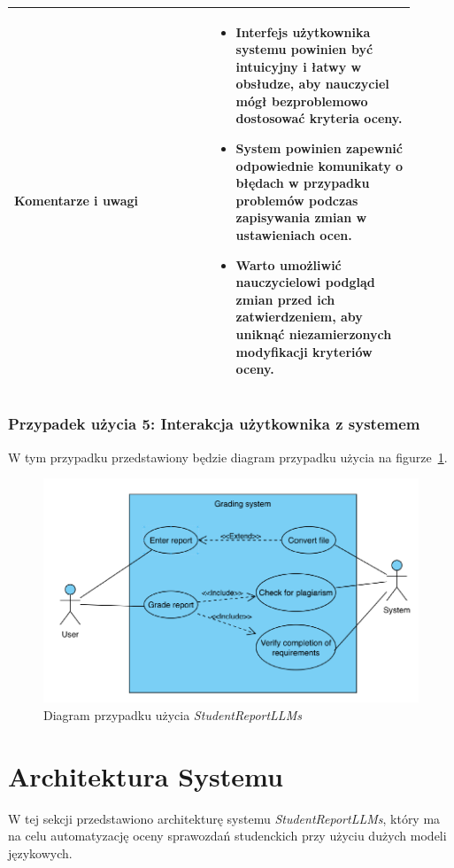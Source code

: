\documentclass[a4paper, 12pt]{article}
\begin{document}
\begin{table}[H]
\begin{tabular}{|p{0.45\linewidth}|p{0.45\linewidth}|}
\hline
\textbf{Komentarze i uwagi} &
\begin{itemize}
    \item Interfejs użytkownika systemu powinien być intuicyjny i łatwy w obsłudze, aby nauczyciel mógł bezproblemowo dostosować kryteria oceny.
    \item System powinien zapewnić odpowiednie komunikaty o błędach w przypadku problemów podczas zapisywania zmian w ustawieniach ocen.
    \item Warto umożliwić nauczycielowi podgląd zmian przed ich zatwierdzeniem, aby uniknąć niezamierzonych modyfikacji kryteriów oceny.
\end{itemize} \\
\hline
\end{tabular}
\end{table}

\subsubsection{Przypadek użycia 5: Interakcja użytkownika z systemem}
W tym przypadku przedstawiony będzie diagram przypadku użycia na figurze~\ref{fig:use-case-diagram}.

\begin{figure}[H]
    \centering
    \includegraphics[width=\textwidth]{img/usecase_diagram}
    \caption{Diagram przypadku użycia \textit{StudentReportLLMs}}
    \label{fig:use-case-diagram}
\end{figure}

\section{Architektura Systemu}
W tej sekcji przedstawiono architekturę systemu \textit{StudentReportLLMs}, który ma na celu automatyzację oceny sprawozdań studenckich przy użyciu dużych modeli językowych.
\end{document}
